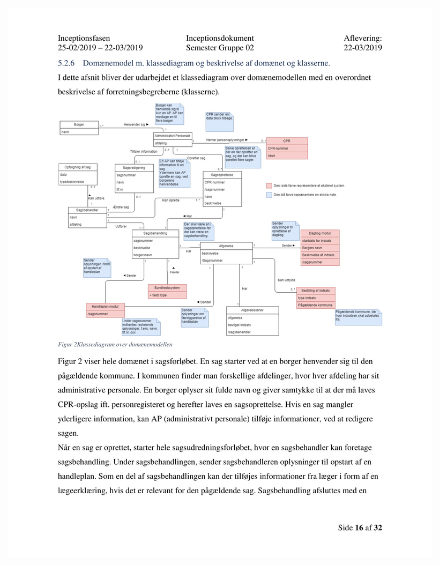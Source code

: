 \begin{figure}[hb]
  \includegraphics[scale = 0.33]{./PNG/Inceptions/Gruppe 02 + InceptionsDokument-17.jpg} 
\end{figure}

